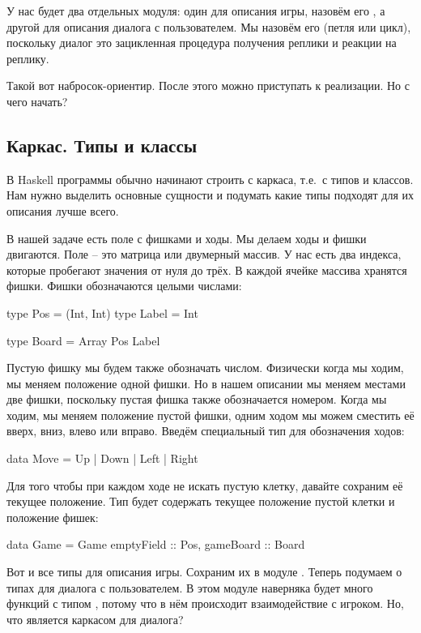 У нас будет два отдельных модуля: один для описания
игры, назовём его , а другой для описания 
диалога с пользователем. Мы назовём его  (петля или
цикл), поскольку диалог это зацикленная процедура 
получения реплики и реакции на реплику.

Такой вот набросок-ориентир. После этого можно приступать 
к реализации. Но с чего начать? 

\subsection{Каркас. Типы и классы}

В Haskell программы
обычно начинают строить с каркаса, т.е.~с типов и классов.
Нам нужно выделить основные сущности и подумать какие типы
подходят для их описания лучше всего.

В нашей задаче есть поле с фишками и ходы. Мы делаем 
ходы и фишки двигаются. Поле -- это матрица или двумерный
массив. У нас есть два индекса, которые пробегают
значения от нуля до трёх. В каждой ячейке массива 
хранятся фишки. Фишки обозначаются целыми числами: 
    
\begin{code}
type Pos    = (Int, Int)
type Label  = Int

type Board  = Array Pos Label
\end{code}

Пустую фишку мы будем также обозначать числом.
Физически когда мы ходим, мы меняем положение одной фишки. 
Но в нашем описании мы меняем местами две фишки, поскольку пустая
фишка также обозначается номером. Когда мы ходим, мы меняем
положение пустой фишки,
одним ходом мы можем сместить её вверх,
вниз, влево или вправо. Введём специальный тип для обозначения
ходов:

\begin{code}
data Move = Up | Down | Left | Right
\end{code}
    
Для того чтобы при каждом ходе не искать пустую клетку,
давайте сохраним её текущее положение. Тип  будет
содержать текущее положение пустой клетки и положение
фишек:

\begin{code}
data Game = Game {
        emptyField  :: Pos,
        gameBoard   :: Board }
\end{code}

Вот и все типы для описания игры. Сохраним их в модуле
. Теперь подумаем о типах для диалога с пользователем. 
В этом модуле наверняка будет много функций с типом ,
потому что в нём происходит взаимодействие с игроком.
Но, что является каркасом для диалога? 

